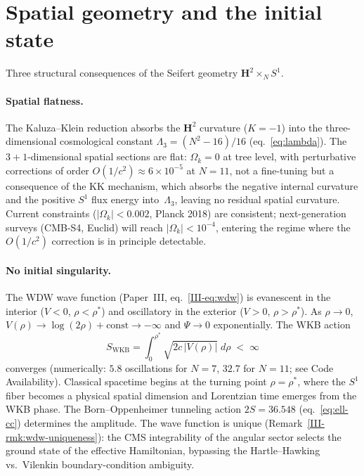 \section{Spatial geometry and the initial state}
\label{sec:geometry-initial}

Three structural consequences of the Seifert geometry
$\mathbf{H}^2 \times_N S^1$.

\paragraph{Spatial flatness.}
The Kaluza--Klein reduction absorbs the $\mathbf{H}^2$ curvature
($K = -1$) into the three-dimensional cosmological constant
$\Lambda_3 = (N^2 - 16)/16$ (eq.~\eqref{eq:lambda}).
The $3{+}1$-dimensional spatial sections are flat:
$\Omega_k = 0$ at tree level, with perturbative corrections
of order $O(1/c^2) \approx 6 \times 10^{-5}$ at $N = 11$, not
a fine-tuning but a consequence of the KK mechanism, which
absorbs the negative internal curvature and the positive $S^1$
flux energy into~$\Lambda_3$, leaving no residual spatial curvature.
Current constraints ($|\Omega_k| < 0.002$, Planck 2018) are
consistent; next-generation surveys (CMB-S4, Euclid) will reach
$|\Omega_k| < 10^{-4}$, entering the regime where the $O(1/c^2)$
correction is in principle detectable.

\paragraph{No initial singularity.}
The WDW wave function (Paper~III, eq.~\eqref{III-eq:wdw}) is
evanescent in the interior ($V < 0$, $\rho < \rho^*$) and
oscillatory in the exterior ($V > 0$, $\rho > \rho^*$).
As $\rho \to 0$, $V(\rho) \to \log(2\rho) + \mathrm{const} \to -\infty$
and $\Psi \to 0$ exponentially.  The WKB action
\begin{equation}\label{eq:wkb-convergence}
  S_{\mathrm{WKB}} = \int_0^{\rho^*}\!\sqrt{2c\,|V(\rho)|}\;d\rho
  \;<\; \infty
\end{equation}
converges (numerically: $5.8$ oscillations for $N = 7$,
$32.7$ for $N = 11$; see Code Availability).
Classical spacetime begins at the turning point
$\rho = \rho^*$, where the $S^1$ fiber becomes a physical
spatial dimension and Lorentzian time emerges from the
WKB phase.
The Born--Oppenheimer tunneling action $2S = 36.548$
(eq.~\eqref{eq:ell-cc}) determines the amplitude.
The wave function is unique
(Remark~\ref{III-rmk:wdw-uniqueness}): the CMS integrability
of the angular sector selects the ground state of the
effective Hamiltonian, bypassing the Hartle--Hawking vs.\
Vilenkin boundary-condition ambiguity.

